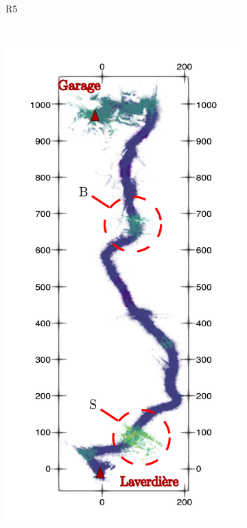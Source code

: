 \begin{figure}[h!]
\begin{center}
\begin{subfigure}[b]{0.3\textwidth}
			\label{fig:R5_pert}
			\caption{R5}
		\end{subfigure}%
		~
		\begin{subfigure}[b]{0.3\textwidth}
			\includegraphics[width=\linewidth]{figs/forest_canyon/run6_perturbations.pdf}

\end{subfigure}
\end{center}
\end{figure}
